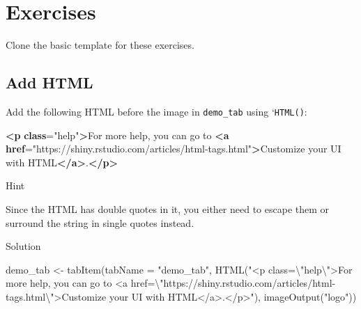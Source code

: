 \documentclass[
  oneside]{book}
\newenvironment{Shaded}{\begin{snugshade}}{\end{snugshade}}
\newcommand{\AttributeTok}[1]{\textcolor[rgb]{0.77,0.63,0.00}{#1}}
\newcommand{\ErrorTok}[1]{\textcolor[rgb]{0.64,0.00,0.00}{\textbf{#1}}}
\newcommand{\FunctionTok}[1]{\textcolor[rgb]{0.00,0.00,0.00}{#1}}
\newcommand{\KeywordTok}[1]{\textcolor[rgb]{0.13,0.29,0.53}{\textbf{#1}}}
\newcommand{\NormalTok}[1]{#1}
\newcommand{\OtherTok}[1]{\textcolor[rgb]{0.56,0.35,0.01}{#1}}
\newcommand{\SpecialCharTok}[1]{\textcolor[rgb]{0.00,0.00,0.00}{#1}}
\newcommand{\StringTok}[1]{\textcolor[rgb]{0.31,0.60,0.02}{#1}}
\begin{document}
\hypertarget{exercises-web}{%
\section{Exercises}\label{exercises-web}}

Clone the basic template for these exercises.

\hypertarget{add-html}{%
\subsection{Add HTML}\label{add-html}}

Add the following HTML before the image in \texttt{demo\_tab} using `\texttt{HTML}\texttt{()}:

\begin{Shaded}
\begin{Highlighting}[]
\KeywordTok{\textless{}p} \ErrorTok{class}\OtherTok{=}\StringTok{"help"}\KeywordTok{\textgreater{}}\NormalTok{For more help, you can go to }\KeywordTok{\textless{}a} \ErrorTok{href}\OtherTok{=}\StringTok{"https://shiny.rstudio.com/articles/html{-}tags.html"}\KeywordTok{\textgreater{}}\NormalTok{Customize your UI with HTML}\KeywordTok{\textless{}/a\textgreater{}}\NormalTok{.}\KeywordTok{\textless{}/p\textgreater{}}
\end{Highlighting}
\end{Shaded}

Hint

Since the HTML has double quotes in it, you either need to escape them or surround the string in single quotes instead.

Solution

\begin{Shaded}
\begin{Highlighting}[]
\NormalTok{demo\_tab }\OtherTok{\textless{}{-}} \FunctionTok{tabItem}\NormalTok{(}\AttributeTok{tabName =} \StringTok{"demo\_tab"}\NormalTok{, }\FunctionTok{HTML}\NormalTok{(}\StringTok{"\textless{}p class=}\SpecialCharTok{\textbackslash{}"}\StringTok{help}\SpecialCharTok{\textbackslash{}"}\StringTok{\textgreater{}For more help, you can go to \textless{}a href=}\SpecialCharTok{\textbackslash{}"}\StringTok{https://shiny.rstudio.com/articles/html{-}tags.html}\SpecialCharTok{\textbackslash{}"}\StringTok{\textgreater{}Customize your UI with HTML\textless{}/a\textgreater{}.\textless{}/p\textgreater{}"}\NormalTok{),}
    \FunctionTok{imageOutput}\NormalTok{(}\StringTok{"logo"}\NormalTok{))}
\end{Highlighting}
\end{Shaded}
\end{document}
